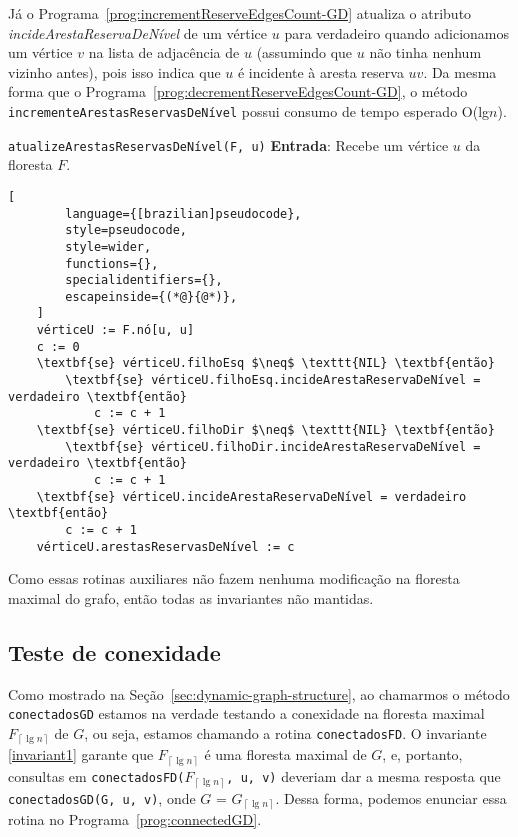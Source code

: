 Já o Programa~\ref{prog:incrementReserveEdgesCount-GD} atualiza o atributo \textit{incideArestaReservaDeNível} de um vértice $u$ para verdadeiro quando adicionamos um vértice $v$ na lista de adjacência de $u$ (assumindo que $u$ não tinha nenhum vizinho antes), pois isso indica que $u$ é incidente à aresta reserva $uv$. Da mesma forma que o Programa~\ref{prog:decrementReserveEdgesCount-GD}, o método \texttt{incrementeArestasReservasDeNível} possui consumo de tempo esperado O(lg$n$).

\begin{programruledcaption}{\texttt{atualizeArestasReservasDeNível(F, u)} \label{prog:updateReserveEdgesCount-GD}}
    \noindent\textbf{Entrada}: Recebe um vértice $u$ da floresta $F$.
    \vspace{-0.5\baselineskip}
    \begin{lstlisting}[
        language={[brazilian]pseudocode},
        style=pseudocode,
        style=wider,
        functions={},
        specialidentifiers={},
        escapeinside={(*@}{@*)},
    ]
    vérticeU := F.nó[u, u]
    c := 0
    \textbf{se} vérticeU.filhoEsq $\neq$ \texttt{NIL} \textbf{então}
        \textbf{se} vérticeU.filhoEsq.incideArestaReservaDeNível = verdadeiro \textbf{então}
            c := c + 1
    \textbf{se} vérticeU.filhoDir $\neq$ \texttt{NIL} \textbf{então}
        \textbf{se} vérticeU.filhoDir.incideArestaReservaDeNível = verdadeiro \textbf{então}
            c := c + 1
    \textbf{se} vérticeU.incideArestaReservaDeNível = verdadeiro \textbf{então}
        c := c + 1
    vérticeU.arestasReservasDeNível := c
    \end{lstlisting}
    \vspace{-0.5\baselineskip}
\end{programruledcaption}

Como essas rotinas auxiliares não fazem nenhuma modificação na floresta maximal do grafo, então todas as invariantes não mantidas.

\subsection{Teste de conexidade}
\label{sec:code-connectivity-test}

Como mostrado na Seção~\ref{sec:dynamic-graph-structure}, ao chamarmos o método \texttt{conectadosGD} estamos na verdade testando a conexidade na floresta maximal $F_{\left\lceil \lg n \right\rceil}$ de $G$, ou seja, estamos chamando a rotina \texttt{conectadosFD}. O invariante \ref{invariant1} garante que $F_{\left\lceil \lg n \right\rceil}$ é uma floresta maximal de $G$, e, portanto, consultas em 
\texttt{conectadosFD($F_{\left\lceil \lg n \right\rceil}$, u, v)} deveriam dar a mesma resposta que \texttt{conectadosGD(G, u, v)}, onde $G$ = $G_{\left\lceil \lg n \right\rceil}$. Dessa forma, podemos enunciar essa rotina no Programa~\ref{prog:connectedGD}.


